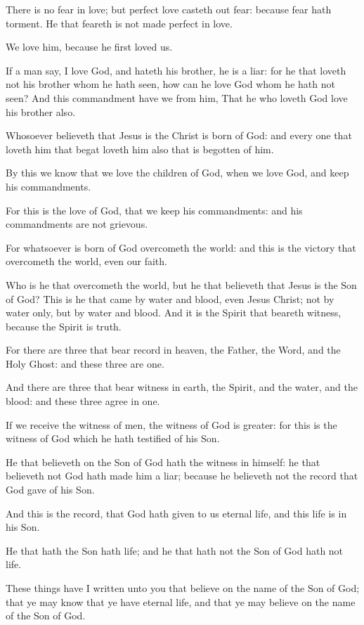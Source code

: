 \Verse There is no fear in love; but perfect love casteth out fear: because fear hath torment. He that feareth is not made perfect in love.

\Verse We love him, because he first loved us.

\Verse If a man say, I love God, and hateth his brother, he is a liar: for he that loveth not his brother whom he hath seen, how can he love God whom he hath not seen?  \Verse And this commandment have we from him, That he who loveth God love his brother also.


\Chapter
\Verse Whosoever believeth that Jesus is the Christ is born of God: and every one that loveth him that begat loveth him also that is begotten of him.

\Verse By this we know that we love the children of God, when we love God, and keep his commandments.

\Verse For this is the love of God, that we keep his commandments: and his commandments are not grievous.

\Verse For whatsoever is born of God overcometh the world: and this is the victory that overcometh the world, even our faith.

\Verse Who is he that overcometh the world, but he that believeth that Jesus is the Son of God?  \Verse This is he that came by water and blood, even Jesus Christ; not by water only, but by water and blood. And it is the Spirit that beareth witness, because the Spirit is truth.

\Verse For there are three that bear record in heaven, the Father, the Word, and the Holy Ghost: and these three are one.

\Verse And there are three that bear witness in earth, the Spirit, and the water, and the blood: and these three agree in one.

\Verse If we receive the witness of men, the witness of God is greater: for this is the witness of God which he hath testified of his Son.

\Verse He that believeth on the Son of God hath the witness in himself: he that believeth not God hath made him a liar; because he believeth not the record that God gave of his Son.

\Verse And this is the record, that God hath given to us eternal life, and this life is in his Son.

\Verse He that hath the Son hath life; and he that hath not the Son of God hath not life.

\Verse These things have I written unto you that believe on the name of the Son of God; that ye may know that ye have eternal life, and that ye may believe on the name of the Son of God.

